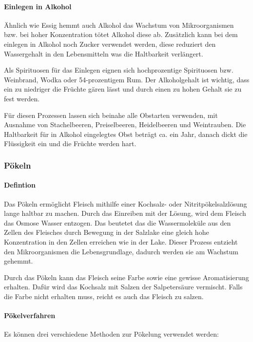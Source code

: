 \paragraph{Einlegen in Alkohol}
Ähnlich wie Essig hemmt auch Alkohol das Wachstum von Mikroorganismen bzw. bei hoher Konzentration tötet Alkohol diese ab. Zusätzlich kann bei dem einlegen in Alkohol noch Zucker verwendet werden, diese reduziert den Wassergehalt in den Lebensmitteln was die Haltbarkeit verlängert. %

Als Spirituosen für das Einlegen eignen sich hochprozentige Spirituosen bzw. Weinbrand, Wodka oder 54-prozentigem Rum. Der Alkoholgehalt ist wichtig, dass ein zu niedriger die Früchte gären lässt und durch einen zu hohen Gehalt sie zu fest werden. %
 
Für diesen Prozessen lassen sich beinahe alle Obstarten verwenden, mit Ausnahme von Stachelbeeren, Preiselbeeren, Heidelbeeren und Weintrauben. Die Haltbarkeit für in Alkohol eingelegtes Obst beträgt ca. ein Jahr, danach dickt die Flüssigkeit ein und die Früchte werden hart. %

\subsubsection{Pökeln}
\paragraph{Defintion}
Das Pökeln ermöglicht Fleisch mithilfe einer Kochsalz- oder Nitritpökelsalzlösung lange haltbar zu machen. Durch das Einreiben mit der Lösung, wird dem Fleisch das Osmose Wasser entzogen. Das beutetet das die Wassermoleküle aus den Zellen des Fleisches durch Bewegung in der Salzlake eine gleich hohe Konzentration in den Zellen erreichen wie in der Lake. Dieser Prozess entzieht den Mikroorganismen die Lebensgrundlage, dadurch werden sie am Wachstum gehemmt.

Durch das Pökeln kann das Fleisch seine Farbe sowie eine gewisse Aromatisierung erhalten. Dafür wird das Kochsalz mit Salzen der Salpetersäure vermischt. Falls die Farbe nicht erhalten muss, reicht es auch das Fleisch zu salzen.

\paragraph{Pökelverfahren}
Es können drei verschiedene Methoden zur Pökelung verwendet werden:

